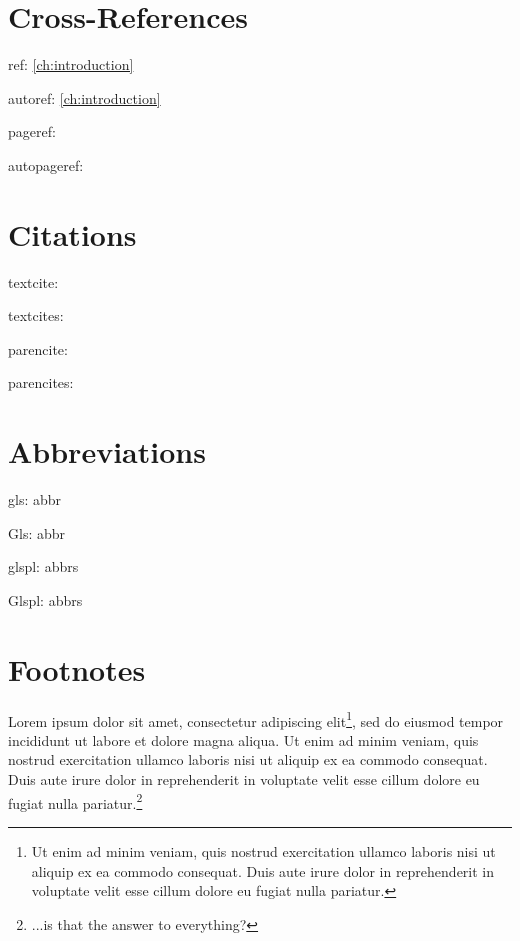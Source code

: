 \newpage

\section*{Cross-References}
\noindent ref: \ref{ch:introduction} %

\noindent autoref: \autoref{ch:introduction} %

\noindent pageref: \pageref{ch:introduction} %

\noindent autopageref:  %


\section*{Citations}
\noindent textcite: \textcite[p. 13]{westfahl:space}

\noindent textcites: \textcites[p. 13]{westfahl:space}{angenendt}[p. 13]{baez/article}

\noindent parencite: \parencite[see][p. 13]{westfahl:space}

\noindent parencites: \parencites(see)(and \autoref{ch:introduction})[p. 13]{westfahl:space}{angenendt}[p. 34]{baez/article}


\section*{Abbreviations}
\noindent gls: \gls{abbr} %

\noindent Gls: \Gls{abbr} %

\noindent glspl: \glspl{abbr} %

\noindent Glspl: \Glspl{abbr} %

\section*{Footnotes}
Lorem ipsum dolor sit amet, consectetur adipiscing elit\footnote{Ut enim ad minim veniam, quis nostrud exercitation ullamco laboris nisi ut aliquip ex ea commodo consequat. Duis aute irure dolor in reprehenderit in voluptate velit esse cillum dolore eu fugiat nulla pariatur.}, sed do eiusmod tempor incididunt ut labore et dolore magna aliqua. Ut enim ad minim veniam, quis nostrud exercitation ullamco laboris nisi ut aliquip ex ea commodo consequat. Duis aute irure dolor in reprehenderit in voluptate velit esse cillum dolore eu fugiat nulla pariatur.\footnote[42]{...is that the answer to everything?}

